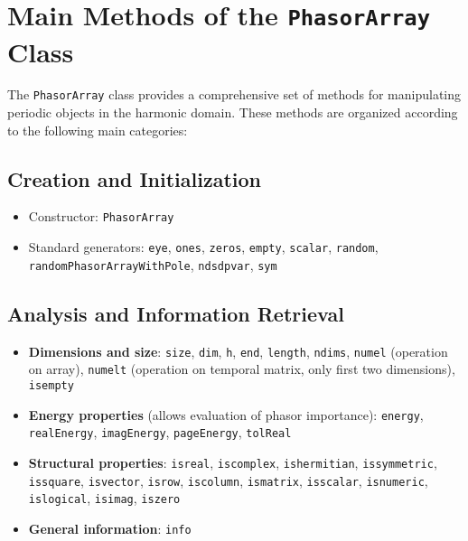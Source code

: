 \documentclass[11pt,a4paper]{article}
\begin{document}
\section{Main Methods of the \texttt{PhasorArray} Class}

The \texttt{PhasorArray} class provides a comprehensive set of methods for manipulating periodic objects in the harmonic domain. These methods are organized according to the following main categories:

\subsection{Creation and Initialization}
\begin{itemize}
    \item Constructor: \texttt{PhasorArray}
    \item Standard generators: \texttt{eye}, \texttt{ones}, \texttt{zeros}, \texttt{empty}, \texttt{scalar}, \texttt{random}, \texttt{randomPhasorArrayWithPole}, \texttt{ndsdpvar}, \texttt{sym}
\end{itemize}

\subsection{Analysis and Information Retrieval}
\begin{itemize}
    \item \textbf{Dimensions and size}: \texttt{size}, \texttt{dim}, \texttt{h}, \texttt{end}, \texttt{length}, \texttt{ndims}, \texttt{numel} (operation on array), \texttt{numelt} (operation on temporal matrix, only first two dimensions), \texttt{isempty}
    \item \textbf{Energy properties} (allows evaluation of phasor importance): \texttt{energy}, \texttt{realEnergy}, \texttt{imagEnergy}, \texttt{pageEnergy}, \texttt{tolReal}
    \item \textbf{Structural properties}: \texttt{isreal}, \texttt{iscomplex}, \texttt{ishermitian}, \texttt{issymmetric}, \texttt{issquare}, \texttt{isvector}, \texttt{isrow}, \texttt{iscolumn}, \texttt{ismatrix}, \texttt{isscalar}, \texttt{isnumeric}, \texttt{islogical}, \texttt{isimag}, \texttt{iszero}
    \item \textbf{General information}: \texttt{info}
\end{itemize}
\end{document}
